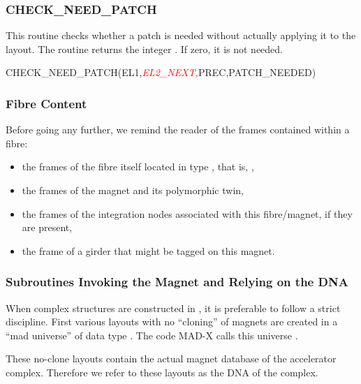 \subsubsection*{CHECK_NEED_PATCH}

%
This routine checks whether a patch is needed without actually applying
it to the layout. The routine returns the integer .
If zero, it is not needed.

\begin{ptccode}
CHECK_NEED_PATCH(EL1,\textit{\textcolor{red}{EL2_NEXT,}}PREC,PATCH_NEEDED)
\end{ptccode}


\subsubsection{Fibre Content}

Before going any further, we remind the reader of the frames contained
within a fibre:
\begin{itemize}
  \item the frames of the fibre itself located in type , that is, ,
  \item the frames of the magnet  and its polymorphic twin,
  \item the frames of the integration nodes associated with this fibre/magnet,
if they are present,
  \item the frame of a girder that might be tagged on this magnet.
\end{itemize}


\subsubsection{Subroutines Invoking the Magnet and Relying on the DNA}

%
When complex structures are constructed in \PTC, it is preferable to follow
a strict discipline. First various layouts with no ``cloning'' of magnets are created
in a ``mad universe'' of data type . The code MAD-X calls this
universe .

%
These no-clone layouts contain the actual magnet database of the accelerator
complex. Therefore we refer to these layouts as the DNA of the complex.

